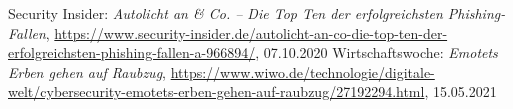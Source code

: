 \begin{frame}
{\begin{thebibliography}{LFVByXX}
     Security Insider: \textit{Autolicht an \& Co. -- Die Top Ten der erfolgreichsten Phishing-Fallen}, \href{https://www.security-insider.de/autolicht-an-co-die-top-ten-der-erfolgreichsten-phishing-fallen-a-966894/}{\url{https://www.security-insider.de/autolicht-an-co-die-top-ten-der-erfolgreichsten-phishing-fallen-a-966894/}}, 07.10.2020
     Wirtschaftswoche: \textit{Emotets Erben gehen auf Raubzug}, \href{https://www.wiwo.de/technologie/digitale-welt/cybersecurity-emotets-erben-gehen-auf-raubzug/27192294.html}{\url{https://www.wiwo.de/technologie/digitale-welt/cybersecurity-emotets-erben-gehen-auf-raubzug/27192294.html}}, 15.05.2021
  \end{thebibliography}
}
\end{frame}






